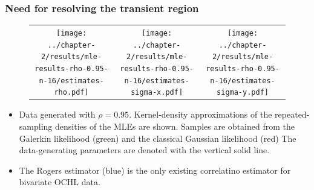\documentclass{beamer}
\begin{document}
\begin{frame}
  \frametitle{Need for resolving the transient region}

  \begin{figure}
  \centering
  \begin{tabular}{ccc}
    
    \begin{minipage}{0.3\textwidth}
      \centering
      \texttt{[image: ../chapter-2/results/mle-results-rho-0.95-n-16/estimates-rho.pdf]}
    \end{minipage}
    & \begin{minipage}{0.3\textwidth}
      \centering
      \texttt{[image: ../chapter-2/results/mle-results-rho-0.95-n-16/estimates-sigma-x.pdf]}
    \end{minipage}
    & \begin{minipage}{0.3\textwidth}
      \centering
      \texttt{[image: ../chapter-2/results/mle-results-rho-0.95-n-16/estimates-sigma-y.pdf]}
    \end{minipage}
  \end{tabular}

\end{figure}
\begin{itemize}
\item Data generated with $\rho=0.95$. Kernel-density approximations
  of the repeated-sampling densities of the MLEs are shown.  Samples
  are obtained from the Galerkin likelihood (green) and the classical
  Gaussian likelihood (red) The data-generating parameters are denoted
  with the vertical solid line.

\item The Rogers estimator (blue) is the only existing correlatino estimator for
  bivariate OCHL data.
  \end{itemize}
\end{frame}


\end{document}
